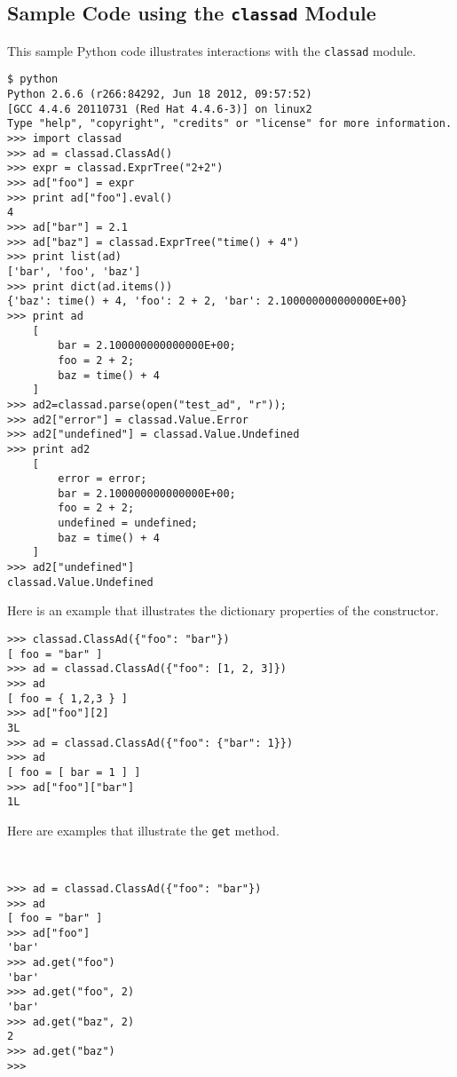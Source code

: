 \subsection{\label{Python-ClassAd-Example} Sample Code using the \texttt{classad} Module}
This sample Python code illustrates interactions with the \texttt{classad} module. 

\footnotesize
\begin{verbatim}
$ python
Python 2.6.6 (r266:84292, Jun 18 2012, 09:57:52) 
[GCC 4.4.6 20110731 (Red Hat 4.4.6-3)] on linux2
Type "help", "copyright", "credits" or "license" for more information.
>>> import classad
>>> ad = classad.ClassAd()
>>> expr = classad.ExprTree("2+2")
>>> ad["foo"] = expr
>>> print ad["foo"].eval()
4
>>> ad["bar"] = 2.1
>>> ad["baz"] = classad.ExprTree("time() + 4")
>>> print list(ad)
['bar', 'foo', 'baz']
>>> print dict(ad.items())
{'baz': time() + 4, 'foo': 2 + 2, 'bar': 2.100000000000000E+00}
>>> print ad
    [
        bar = 2.100000000000000E+00; 
        foo = 2 + 2; 
        baz = time() + 4
    ]
>>> ad2=classad.parse(open("test_ad", "r"));
>>> ad2["error"] = classad.Value.Error
>>> ad2["undefined"] = classad.Value.Undefined
>>> print ad2
    [
        error = error; 
        bar = 2.100000000000000E+00; 
        foo = 2 + 2; 
        undefined = undefined; 
        baz = time() + 4
    ]
>>> ad2["undefined"]
classad.Value.Undefined

\end{verbatim}
\normalsize

Here is an example that illustrates the dictionary properties of
the constructor.
\footnotesize
\begin{verbatim}
>>> classad.ClassAd({"foo": "bar"})
[ foo = "bar" ]
>>> ad = classad.ClassAd({"foo": [1, 2, 3]})
>>> ad
[ foo = { 1,2,3 } ]
>>> ad["foo"][2]
3L
>>> ad = classad.ClassAd({"foo": {"bar": 1}})
>>> ad
[ foo = [ bar = 1 ] ]
>>> ad["foo"]["bar"]
1L

\end{verbatim}
\normalsize

Here are examples that illustrate the \texttt{get} method.
\footnotesize
\begin{verbatim}


>>> ad = classad.ClassAd({"foo": "bar"})
>>> ad
[ foo = "bar" ]
>>> ad["foo"]
'bar'
>>> ad.get("foo")
'bar'
>>> ad.get("foo", 2)
'bar'
>>> ad.get("baz", 2)
2
>>> ad.get("baz")
>>>

\end{verbatim}
\normalsize


